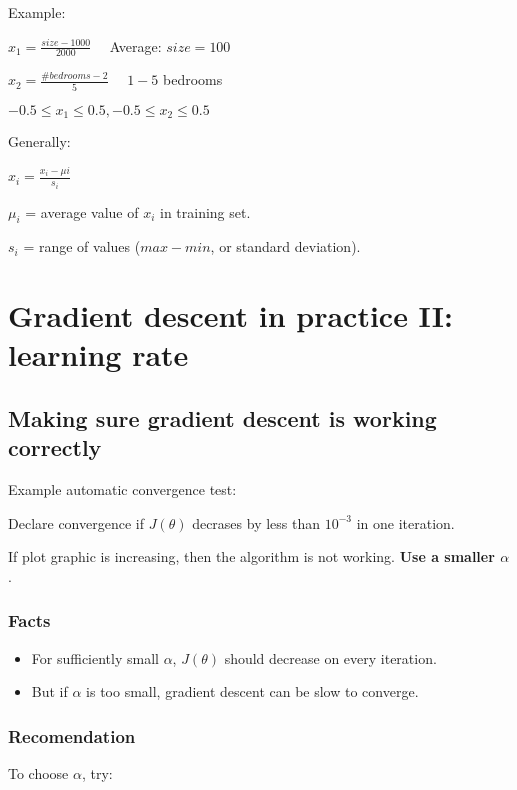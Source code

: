 \documentclass[a4paper]{report}
\begin{document}
      Example:

      $x_{1} = \frac{size - 1000}{2000}$ \ \ Average: $size = 100$

      $x_{2} = \frac{\#bedrooms - 2}{5}$ \ \ $1 - 5$ bedrooms

      $-0.5 \leq x_{1} \leq 0.5, -0.5 \leq x_{2} \leq 0.5$

      Generally:

      $x_{i} = \frac{x_{i} - \mu{i}}{s_{i}}$

      $\mu_{i}$ = average value of $x_{i}$ in training set.

      $s_{i}$ = range of values ($max - min$, or standard deviation).

    \section{Gradient descent in practice II: learning rate}

      \subsection{Making sure gradient descent is working correctly}

        Example automatic convergence test:

        Declare convergence if $J(\theta)$ decrases by less than $10^{-3}$ in one iteration.

        If plot graphic is increasing, then the algorithm is not working. \textbf{Use a smaller $\alpha$}.

        \subsubsection{Facts}

          \begin{itemize}
            \item For sufficiently small $\alpha$, $J(\theta)$ should decrease on every iteration.
            \item But if $\alpha$ is too small, gradient descent can be slow to converge.
          \end{itemize}

        \subsubsection{Recomendation}

          To choose $\alpha$, try:
\end{document}
